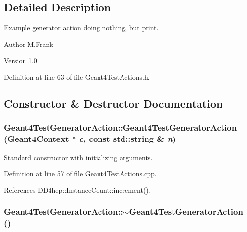 \subsection{Detailed Description}
Example generator action doing nothing, but print. \begin{DoxyAuthor}{Author}
M.Frank 
\end{DoxyAuthor}
\begin{DoxyVersion}{Version}
1.0 
\end{DoxyVersion}


Definition at line 63 of file Geant4TestActions.h.

\subsection{Constructor \& Destructor Documentation}
\hypertarget{class_d_d4hep_1_1_simulation_1_1_test_1_1_geant4_test_generator_action_a7bbaab8b38a9771b99190c270fedb637}{
\subsubsection[{Geant4TestGeneratorAction}]{\setlength{\rightskip}{0pt plus 5cm}Geant4TestGeneratorAction::Geant4TestGeneratorAction ({\bf Geant4Context} $\ast$ {\em c}, \/  const std::string \& {\em n})}}
\label{class_d_d4hep_1_1_simulation_1_1_test_1_1_geant4_test_generator_action_a7bbaab8b38a9771b99190c270fedb637}


Standard constructor with initializing arguments. 

Definition at line 57 of file Geant4TestActions.cpp.

References DD4hep::InstanceCount::increment().\hypertarget{class_d_d4hep_1_1_simulation_1_1_test_1_1_geant4_test_generator_action_a41570e16f5e7aa86d68cf44764feb852}{
\subsubsection[{$\sim$Geant4TestGeneratorAction}]{\setlength{\rightskip}{0pt plus 5cm}Geant4TestGeneratorAction::$\sim$Geant4TestGeneratorAction ()}}
\label{class_d_d4hep_1_1_simulation_1_1_test_1_1_geant4_test_generator_action_a41570e16f5e7aa86d68cf44764feb852}


